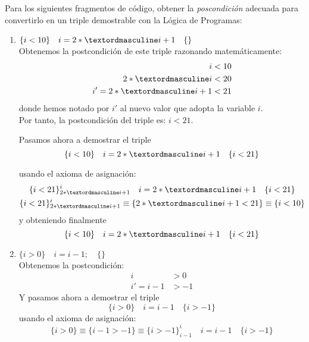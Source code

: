 \begin{ejercicio}
    Para los siguientes fragmentos de código, obtener la \emph{poscondición} adecuada para convertirlo en un triple demostrable con la Lógica de Programas:
    \begin{enumerate}
        \item $\{i < 10\} \quad i = 2 \astº i + 1 \quad \{ \}$\\
            Obtenemos la postcondición de este triple razonando matemáticamente:
            \begin{align*}
                i &< 10 \\
                2\astº i &< 20 \\
                i' = 2\astº i + 1 &< 21
            \end{align*}
            donde hemos notado por $i'$ al nuevo valor que adopta la variable $i$.\\

            Por tanto, la postcondición del triple es: $i < 21$.

            Pasamos ahora a demostrar el triple
            \begin{equation*}
               \{i < 10\} \quad i = 2 \astº i + 1 \quad \{i<21\}
            \end{equation*}
            
            usando el axioma de asignación:
            \begin{gather*}
                \{i<21\}^i_{2\astº i + 1}\quad i=2\astº i + 1\quad \{i<21\} \\
                \{i<21\}^i_{2\astº i + 1} \equiv \{2\astº i + 1 < 21\} \equiv \{i < 10\} 
            \end{gather*}
            y obteniendo finalmente
            \begin{equation*}
                \{i<10\}\quad i=2\astº i + 1\quad \{i<21\} \\
            \end{equation*}

        \item $\{i > 0\} \quad i = i - 1; \quad \{ \}$\\
            Obtenemos la postcondición:
            \begin{align*}
                i &> 0 \\
                i' = i-1 &> -1
            \end{align*}
            Y pasamos ahora a demostrar el triple
            \begin{equation*}
                \{i>0\} \quad i=i-1 \quad\{i>-1\}
            \end{equation*}
            usando el axioma de asignación:
            \begin{equation*}
                \{i>0\} \equiv \{i-1>-1\} \equiv \{i>-1\}^i_{i-1} \quad i=i-1 \quad\{i>-1\}
            \end{equation*}


\end{enumerate}
\end{ejercicio}
